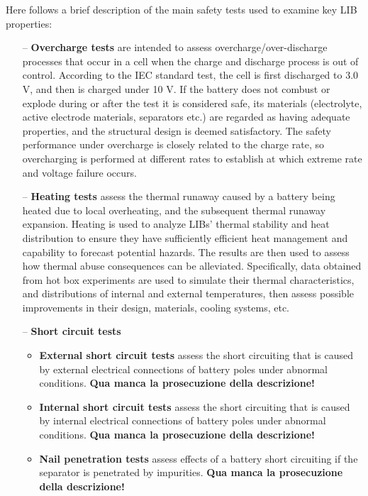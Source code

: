 Here follows a brief description of the main safety tests used to examine key LIB properties:

\begin{itemize}
    \item[--] \textbf{Overcharge tests} are intended to assess overcharge/over-discharge processes that occur in a cell when the charge and discharge process is out of control. According to the IEC standard test, the cell is first discharged to 3.0 V, and then is charged under 10 V. If the battery does not combust or explode during or after the test it is considered safe, its materials (electrolyte, active electrode materials, separators etc.) are regarded as having adequate properties, and the structural design is deemed satisfactory. The safety performance under overcharge is closely related to the charge rate, so overcharging is performed at different rates to establish at which extreme rate and voltage failure occurs.
    \item[--] \textbf{Heating tests} assess the thermal runaway caused by a battery being heated due to local overheating, and the subsequent thermal runaway expansion. Heating is used to analyze LIBs' thermal stability and heat distribution to ensure they have sufficiently efficient heat management and capability to forecast potential hazards. The results are then used to assess how thermal abuse consequences can be alleviated. Specifically, data obtained from hot box experiments are used to simulate their thermal characteristics, and distributions of internal and external temperatures, then assess possible improvements in their design, materials, cooling systems, etc.
    \item[--] \textbf{Short circuit tests}
    \begin{itemize}
        \item \textbf{External short circuit tests} assess the short circuiting that is caused by external electrical connections of battery poles under abnormal conditions. \textbf{Qua manca la prosecuzione della descrizione!}
        \item \textbf{Internal short circuit tests} assess the short circuiting that is caused by internal electrical connections of battery poles under abnormal conditions. \textbf{Qua manca la prosecuzione della descrizione!}
        \item \textbf{Nail penetration tests} assess effects of a battery short circuiting if the separator is penetrated by impurities. \textbf{Qua manca la prosecuzione della descrizione!}
    \end{itemize}
\end{itemize}

